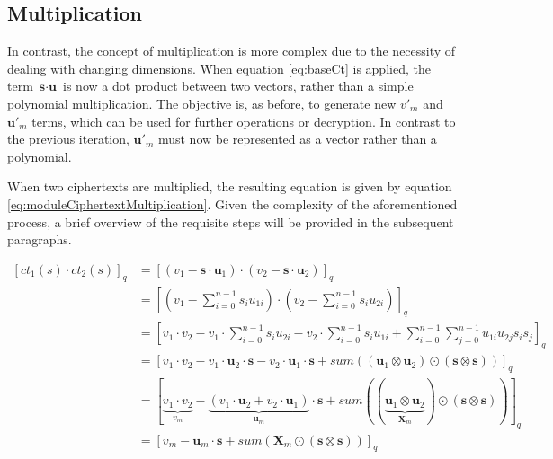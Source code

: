 \subsection*{Multiplication}

In contrast, the concept of multiplication is more complex due to the necessity of dealing with changing dimensions. When equation \ref{eq:baseCt} is applied, the term $\textbf{s}\cdot \textbf{u}$ is now a dot product between two vectors, rather than a simple polynomial multiplication. The objective is, as before, to generate new $v'_m$ and $\textbf{u}'_m$ terms, which can be used for further operations or decryption. In contrast to the previous iteration, $\textbf{u}'_m$ must now be represented as a vector rather than a polynomial.

When two ciphertexts are multiplied, the resulting equation is given by equation \ref{eq:moduleCiphertextMultiplication}. Given the complexity of the aforementioned process, a brief overview of the requisite steps will be provided in the subsequent paragraphs.

\begin{equation}
  \begin{split}
    [ct_1(s)\cdot ct_2(s)]_q & = [(v_1-\textbf{s}\cdot \textbf{u}_1) \cdot (v_2-\textbf{s}\cdot \textbf{u}_2)]_q                                                                                                                                                              \\
                             & = [(v_1-\sum_{i=0}^{n-1}s_iu_{1i}) \cdot (v_2-\sum_{i=0}^{n-1}s_iu_{2i})]_q                                                                                                                                                                    \\
                             & = [v_1\cdot v_2 - v_1\cdot \sum_{i=0}^{n-1}s_iu_{2i}- v_2\cdot \sum_{i=0}^{n-1}s_iu_{1i} + \sum_{i=0}^{n-1}\sum_{j=0}^{n-1}u_{1i}u_{2j}s_is_j]_q                                                                                               \\    
                             & = [v_1\cdot v_2 - v_1\cdot \textbf{u}_2\cdot \textbf{s} - v_2\cdot \textbf{u}_1\cdot \textbf{s} + sum((\textbf{u}_{1}\otimes\textbf{u}_{2})\odot(\textbf{s}\otimes\textbf{s}))]_q                                                              \\
                             & = [\underbrace{v_1\cdot v_2}_{v_m} - \underbrace{(v_1\cdot \textbf{u}_2 + v_2\cdot \textbf{u}_1)}_{\textbf{u}_m}\cdot \textbf{s} + sum((\underbrace{\textbf{u}_{1}\otimes\textbf{u}_{2}}_{\textbf{X}_m})\odot(\textbf{s}\otimes\textbf{s}))]_q \\
                             & = [v_m - \textbf{u}_m\cdot \textbf{s} + sum(\textbf{X}_m\odot(\textbf{s}\otimes\textbf{s}))]_q
  \end{split}
  \label{eq:moduleCiphertextMultiplication}
\end{equation}

